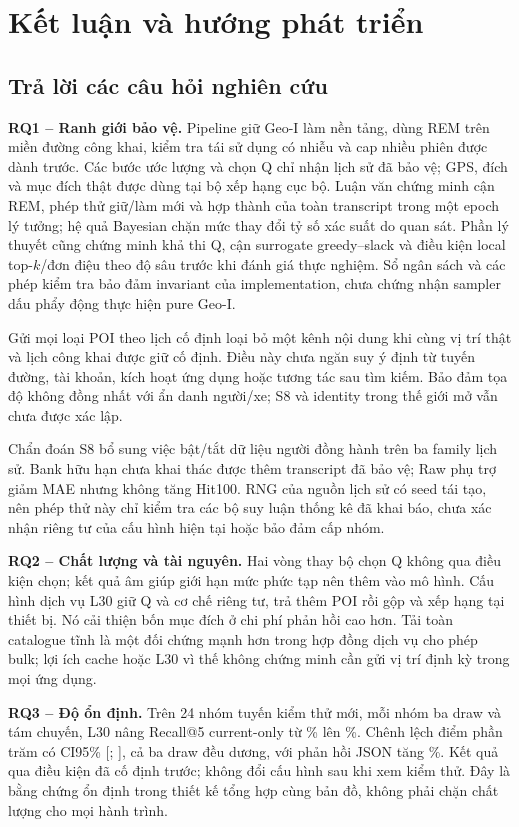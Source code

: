 \chapter{Kết luận và hướng phát triển}
\label{ch:conclusions}

\section{Trả lời các câu hỏi nghiên cứu}

\textbf{RQ1 -- Ranh giới bảo vệ.} Pipeline giữ Geo-I làm nền tảng, dùng REM trên miền đường công khai, kiểm tra tái sử dụng có nhiễu và cap nhiều phiên được dành trước. Các bước ước lượng và chọn Q chỉ nhận lịch sử đã bảo vệ; GPS, đích và mục đích thật được dùng tại bộ xếp hạng cục bộ. Luận văn chứng minh cận REM, phép thử giữ/làm mới và hợp thành của toàn transcript trong một epoch lý tưởng; hệ quả Bayesian chặn mức thay đổi tỷ số xác suất do quan sát. Phần lý thuyết cũng chứng minh khả thi Q, cận surrogate greedy--slack và điều kiện local top-$k$/đơn điệu theo độ sâu trước khi đánh giá thực nghiệm. Sổ ngân sách và các phép kiểm tra bảo đảm invariant của implementation, chưa chứng nhận sampler dấu phẩy động thực hiện pure Geo-I.

Gửi mọi loại POI theo lịch cố định loại bỏ một kênh nội dung khi cùng vị trí thật và lịch công khai được giữ cố định. Điều này chưa ngăn suy ý định từ tuyến đường, tài khoản, kích hoạt ứng dụng hoặc tương tác sau tìm kiếm. Bảo đảm tọa độ không đồng nhất với ẩn danh người/xe; S8 và identity trong thế giới mở vẫn chưa được xác lập.

Chẩn đoán S8 bổ sung việc bật/tắt dữ liệu người đồng hành trên ba family lịch sử. Bank hữu hạn chưa khai thác được thêm transcript đã bảo vệ; Raw phụ trợ giảm MAE nhưng không tăng Hit100. RNG của nguồn lịch sử có seed tái tạo, nên phép thử này chỉ kiểm tra các bộ suy luận thống kê đã khai báo, chưa xác nhận riêng tư của cấu hình hiện tại hoặc bảo đảm cấp nhóm.

\textbf{RQ2 -- Chất lượng và tài nguyên.} Hai vòng thay bộ chọn Q không qua điều kiện chọn; kết quả âm giúp giới hạn mức phức tạp nên thêm vào mô hình. Cấu hình dịch vụ L30 giữ Q và cơ chế riêng tư, trả thêm POI rồi gộp và xếp hạng tại thiết bị. Nó cải thiện bốn mục đích ở chi phí phản hồi cao hơn. Tải toàn catalogue tĩnh là một đối chứng mạnh hơn trong hợp đồng dịch vụ cho phép bulk; lợi ích cache hoặc L30 vì thế không chứng minh cần gửi vị trí định kỳ trong mọi ứng dụng.

\textbf{RQ3 -- Độ ổn định.} Trên 24 nhóm tuyến kiểm thử mới, mỗi nhóm ba draw và tám chuyến, L30 nâng Recall@5 current-only từ \EvalFreshRecallBefore{}\% lên \EvalFreshRecallAfter{}\%. Chênh lệch \EvalFreshGain{} điểm phần trăm có CI95\% [\EvalFreshLow{}; \EvalFreshHigh{}], cả ba draw đều dương, với phản hồi JSON tăng \EvalReplyGrowth{}\%. Kết quả qua điều kiện đã cố định trước; không đổi cấu hình sau khi xem kiểm thử. Đây là bằng chứng ổn định trong thiết kế tổng hợp cùng bản đồ, không phải chặn chất lượng cho mọi hành trình.

